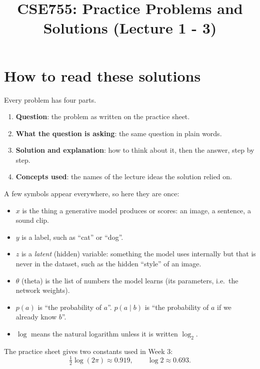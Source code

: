 \documentclass[12pt,a4paper]{article}
\title{CSE755: Practice Problems and Solutions (Lecture 1 - 3)}
\author{}
\date{}
\begin{document}
\maketitle
\tableofcontents
\newpage

\section{How to read these solutions}

Every problem has four parts.

\begin{enumerate}[leftmargin=*]
\item \textbf{Question}: the problem as written on the practice sheet.
\item \textbf{What the question is asking}: the same question in plain words.
\item \textbf{Solution and explanation}: how to think about it, then the answer, step by step.
\item \textbf{Concepts used}: the names of the lecture ideas the solution relied on.
\end{enumerate}

A few symbols appear everywhere, so here they are once:

\begin{itemize}[leftmargin=*]
\item $x$ is the thing a generative model produces or scores: an image, a sentence, a sound clip.
\item $y$ is a label, such as ``cat'' or ``dog''.
\item $z$ is a \emph{latent} (hidden) variable: something the model uses internally but that is never in the dataset, such as the hidden ``style'' of an image.
\item $\theta$ (theta) is the list of numbers the model learns (its parameters, i.e.\ the network weights).
\item $p(a)$ is ``the probability of $a$''. $p(a \mid b)$ is ``the probability of $a$ if we already know $b$''.
\item $\log$ means the natural logarithm unless it is written $\log_2$.
\end{itemize}

The practice sheet gives two constants used in Week 3:
\[
\tfrac{1}{2}\log(2\pi) \approx 0.919, \qquad \log 2 \approx 0.693.
\]
\end{document}
